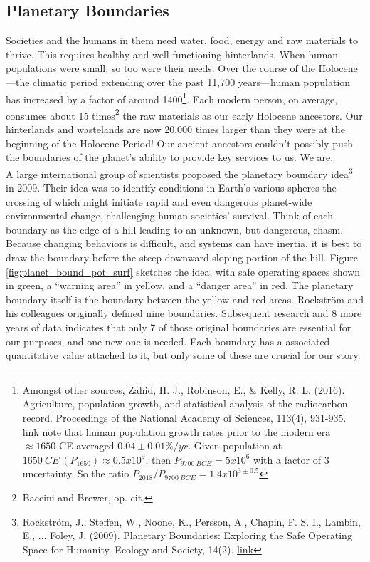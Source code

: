 \subsection{Planetary Boundaries}\label{pbs}
Societies and the humans in them need water, food, energy and raw materials to thrive. This requires healthy and well-functioning hinterlands. When human populations were small, so too were their needs. Over the course of the Holocene---the climatic period extending over the past 11,700 years---human population has increased by a factor of around 1400\footnote{Amongst other sources, Zahid, H. J., Robinson, E., \& Kelly, R. L. (2016). Agriculture, population growth, and statistical analysis of the radiocarbon record. Proceedings of the National Academy of Sciences, 113(4), 931-935. \href{https://doi.org/10.1073/pnas.1517650112}{link} note that human population growth rates prior to the modern era $\approx1650$ CE averaged $0.04\pm0.01\%/yr$. Given population at $1650\:CE\:(P_{1650})\approx0.5x10^9$, then $P_{9700\:BCE}=5x10^6$ with a factor of 3 uncertainty. So the ratio $P_{2018}/P_{9700\:BCE}=1.4x10^{3\pm0.5}$}. Each modern person, on average, consumes about 15 times\footnote{Baccini and Brewer, op. cit.} the raw materials as our early Holocene ancestors. Our hinterlands and wastelands are now 20,000 times larger than they were at the beginning of the Holocene Period! Our ancient ancestors couldn't possibly push the boundaries of the planet's ability to provide key services to us. We are.\\

A large international group of scientists proposed the planetary boundary idea\footnote{Rockstr\"{o}m, J., Steffen, W., Noone, K., Persson, A., Chapin, F. S. I., Lambin, E., ... Foley, J. (2009). Planetary Boundaries: Exploring the Safe Operating Space for Humanity. Ecology and Society, 14(2). \href{https://doi.org/10.5751/ES-03180-140232}{link}} in 2009. Their idea was to identify conditions in Earth's various spheres the crossing of which might initiate rapid and even dangerous planet-wide environmental change, challenging human societies' survival. Think of each boundary as the edge of a hill leading to an unknown, but dangerous, chasm. Because changing behaviors is difficult, and systems can have inertia, it is best to draw the boundary before the steep downward sloping portion of the hill. Figure \ref{fig:planet_bound_pot_surf} sketches the idea, with safe operating spaces shown in green, a ``warning area'' in yellow, and a ``danger area'' in red. The planetary boundary itself is the boundary between the yellow and red areas. Rockstr\"{o}m and his colleagues originally defined nine boundaries. Subsequent research and 8 more years of data indicates that only 7 of those original boundaries are essential for our purposes, and one new one is needed. Each boundary has a associated quantitative value attached to it, but only some of these are crucial for our story.\\ 

